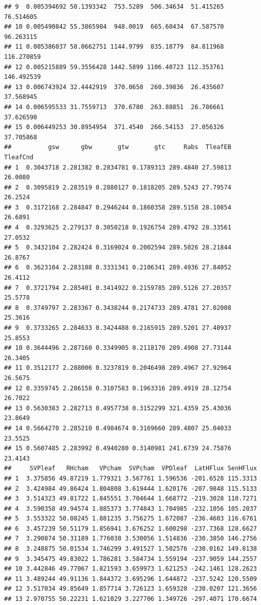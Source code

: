 \documentclass[]{krantz}
\theoremstyle{definition}
\theoremstyle{definition}
\theoremstyle{definition}
\theoremstyle{remark}
\begin{document}
\begin{verbatim}
## 9  0.005394692 50.1393342  753.5289  506.34634  51.415265  76.514605
## 10 0.005490842 55.3865984  948.0019  665.60434  67.587570  96.263115
## 11 0.005386037 58.0662751 1144.9799  835.18779  84.811968 116.270859
## 12 0.005215889 59.3556428 1442.5899 1106.40723 112.353761 146.492539
## 13 0.006743924 32.4442919  370.0650  260.39836  26.435607  37.568945
## 14 0.006595533 31.7559713  370.6780  263.88851  26.786661  37.626590
## 15 0.006449253 30.8954954  371.4540  266.54153  27.056326  37.705868
##          gsw      gbw       gtw       gtc     Rabs  TleafEB TleafCnd
## 1  0.3043718 2.281382 0.2834781 0.1789313 289.4840 27.59813  26.0080
## 2  0.3095819 2.283519 0.2880127 0.1818205 289.5243 27.79574  26.2524
## 3  0.3172168 2.284847 0.2946244 0.1860358 289.5158 28.10854  26.6891
## 4  0.3293625 2.279137 0.3050218 0.1926754 289.4792 28.33561  27.0532
## 5  0.3432104 2.282424 0.3169024 0.2002594 289.5026 28.21844  26.8767
## 6  0.3623104 2.283108 0.3331341 0.2106341 289.4936 27.84052  26.4112
## 7  0.3721794 2.285401 0.3414922 0.2159785 289.5126 27.20357  25.5778
## 8  0.3749797 2.283367 0.3438244 0.2174733 289.4781 27.02008  25.3616
## 9  0.3733265 2.284633 0.3424488 0.2165915 289.5201 27.40937  25.8553
## 10 0.3644496 2.287160 0.3349905 0.2118170 289.4908 27.73144  26.3405
## 11 0.3512177 2.288006 0.3237819 0.2046498 289.4967 27.92964  26.5675
## 12 0.3359745 2.286158 0.3107583 0.1963316 289.4919 28.12754  26.7022
## 13 0.5630383 2.282713 0.4957738 0.3152299 321.4359 25.43036  23.8649
## 14 0.5664270 2.285210 0.4984674 0.3169660 289.4807 25.04033  23.5525
## 15 0.5607485 2.283992 0.4940280 0.3140981 241.6739 24.75876  23.4143
##     SVPleaf   RHcham   VPcham  SVPcham  VPDleaf  LatHFlux SenHFlux
## 1  3.375856 49.87219 1.779321 3.567761 1.596536 -201.6528 115.3313
## 2  3.424984 49.86424 1.804808 3.619444 1.620176 -207.9848 115.5133
## 3  3.514323 49.81722 1.845551 3.704644 1.668772 -219.3028 110.7271
## 4  3.590358 49.94574 1.885373 3.774843 1.704985 -232.1056 105.2037
## 5  3.553322 50.08245 1.881235 3.756275 1.672087 -236.4603 116.6761
## 6  3.457239 50.51179 1.856941 3.676252 1.600298 -237.7368 128.6627
## 7  3.290874 50.31189 1.776038 3.530056 1.514836 -230.3850 146.2756
## 8  3.248875 50.01534 1.746299 3.491527 1.502576 -230.0162 149.8138
## 9  3.345475 49.83022 1.786281 3.584734 1.559194 -237.9059 144.2557
## 10 3.442846 49.77067 1.821593 3.659973 1.621253 -242.1461 128.2623
## 11 3.489244 49.91136 1.844372 3.695296 1.644872 -237.5242 120.5509
## 12 3.517034 49.85649 1.857714 3.726123 1.659320 -230.0207 121.3656
## 13 2.970755 50.22231 1.621029 3.227706 1.349726 -297.4071 170.6674

\end{verbatim}
\end{document}
